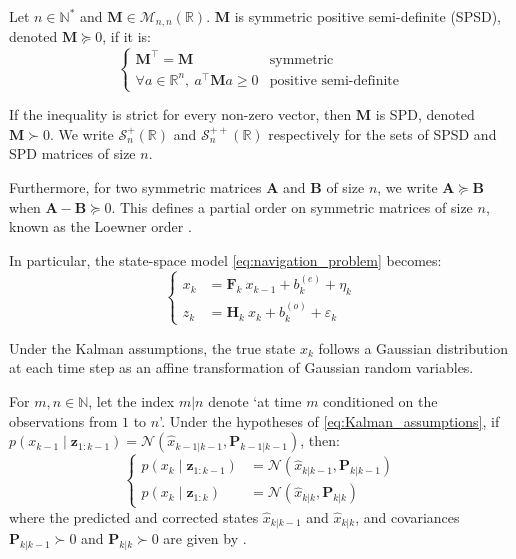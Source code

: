 \begin{definition}\label{th:matrix_SPSD}
	Let $n\in\mathbb{N}^*$ and $\mathbf{M}\in\mathcal{M}_{n,n}(\mathbb{R})$. $\mathbf{M}$ is symmetric positive semi-definite (SPSD), denoted $\mathbf{M}\succeq0$, if it is:
	\begin{equation}
		\left\{\begin{array}{ll}
		\mathbf{M}^\top=\mathbf{M}&\text{symmetric}\\
		\forall a\in\mathbb{R}^n,\:a^\top \mathbf{M}a\geq0&\text{positive semi-definite}
		\end{array}\right.
	\end{equation}

	If the inequality is strict for every non-zero vector, then $\mathbf{M}$ is SPD, denoted $\mathbf{M}\succ0$. We write $\mathcal{S}_n^+(\mathbb{R})$ and $\mathcal{S}_n^{++}(\mathbb{R})$ respectively for the sets of SPSD and SPD matrices of size $n$.

	Furthermore, for two symmetric matrices $\mathbf{A}$ and $\mathbf{B}$ of size $n$, we write $\mathbf{A}\succeq \mathbf{B}$ when $\mathbf{A}-\mathbf{B}\succeq0$. This defines a partial order on symmetric matrices of size $n$, known as the Loewner order \cite{bib:matrix-analysis}.
\end{definition}

In particular, the state-space model \eqref{eq:navigation_problem} becomes:
\begin{equation}
	\left\{\begin{aligned}
	x_k&=\mathbf{F}_k\:x_{k-1}+b_k^{(e)}+\eta_k\\
	z_k&=\mathbf{H}_k\:x_k+b_k^{(o)}+\varepsilon_k
	\end{aligned}\right.\label{eq:navigation_Kalman}
\end{equation}

Under the Kalman assumptions, the true state $x_k$ follows a Gaussian distribution at each time step as an affine transformation of Gaussian random variables.

\begin{proposition}\label{th:Kalman}
	For $m,n\in\mathbb{N}$, let the index $m|n$ denote `at time $m$ conditioned on the observations from $1$ to $n$'. Under the hypotheses of \eqref{eq:Kalman_assumptions}, if $p(x_{k-1}\mid\mathbf{z}_{1:k-1})=\mathcal{N}\left(\hat{x}_{k-1|k-1},\mathbf{P}_{k-1|k-1}\right)$, then:
	\begin{equation}
		\left\{\begin{aligned}
		p(x_k\mid\mathbf{z}_{1:k-1})&=\mathcal{N}\left(\hat{x}_{k|k-1},\mathbf{P}_{k|k-1}\right)\\
		p(x_k\mid\mathbf{z}_{1:k})&=\mathcal{N}\left(\hat{x}_{k|k},\mathbf{P}_{k|k}\right)
		\end{aligned}\right.
	\end{equation}
	where the predicted and corrected states $\hat{x}_{k|k-1}$ and $\hat{x}_{k|k}$, and covariances $\mathbf{P}_{k|k-1}\succ0$ and $\mathbf{P}_{k|k}\succ0$ are given by .
\end{proposition}

